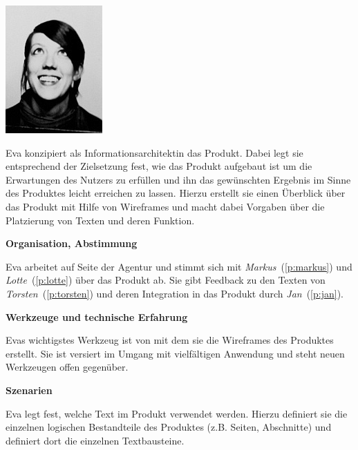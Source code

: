 \begin{multicols}{2}

\begin{center}
\includegraphics[width=0.5\columnwidth]{media/eva.jpg}
\end{center}


Eva konzipiert als Informationsarchitektin das Produkt. Dabei legt sie entsprechend der Zielsetzung fest, wie das Produkt aufgebaut ist um die Erwartungen des Nutzers zu erfüllen und ihn das gewünschten Ergebnis im Sinne des Produktes leicht erreichen zu lassen. Hierzu erstellt sie einen Überblick über das Produkt mit Hilfe von Wireframes und macht dabei Vorgaben über die Platzierung von Texten und deren Funktion.

\textbf{Organisation, Abstimmung}

Eva arbeitet auf Seite der Agentur und stimmt sich mit \emph{Markus}~(\ref{p:markus}) und \emph{Lotte}~(\ref{p:lotte}) über das Produkt ab. Sie gibt Feedback zu den Texten von \emph{Torsten}~(\ref{p:torsten}) und deren Integration in das Produkt durch \emph{Jan}~(\ref{p:jan}).

\textbf{Werkzeuge und technische Erfahrung}

Evas wichtigstes Werkzeug ist  von  mit dem sie die Wireframes des Produktes erstellt. Sie ist versiert im Umgang mit vielfältigen Anwendung und steht neuen Werkzeugen offen gegenüber.

\columnbreak

\textbf{Szenarien}

Eva legt fest, welche Text im Produkt verwendet werden. Hierzu definiert sie die einzelnen logischen Bestandteile des Produktes (z.B. Seiten, Abschnitte) und definiert dort die einzelnen Textbausteine.


\end{multicols}
